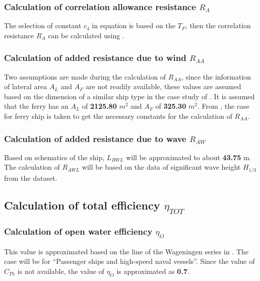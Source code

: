 \subsubsection*{Calculation of correlation allowance resistance $R_A$}

The selection of constant $c_4$ in equation  is based on the $T_F$, then the correlation resistance $R_A$ can be calculated using .

\subsubsection*{Calculation of added resistance due to wind $R_{AA}$}

Two assumptions are made during the calculation of $R_{AA}$, since the information of lateral area $A_L$ and $A_F$ are not readily available, these values are assumed based on the dimension of a similar ship type in the case study of . It is assumed that the ferry has an $A_L$ of \textbf{2125.80} $m^2$ and $A_F$ of \textbf{325.30} $m^2$. From , the case for ferry ship is taken to get the necessary constants for the calculation of $R_{AA}$. 

\subsubsection*{Calculation of added resistance due to wave $R_{AW}$ }

Based on schematics of the ship, $L_{BWL}$ will be approximated to about \textbf{43.75} m. The calculation of $R_{AWL}$ will be based on the data of significant wave height $H_{1/3}$ from the dataset.

\pagebreak

\subsection{Calculation of total efficiency $\eta_{TOT}$}\label{sec:eta_tot_method}

\subsubsection*{Calculation of open water efficiency $\eta_O$}

This value is approximated based on the line of the Wageningen series in  . The case will be for ``Passenger ships and high-speed naval vessels''. Since the value of $C_{Th}$ is not available, the value of $\eta_O$ is approximated as \textbf{0.7}.

